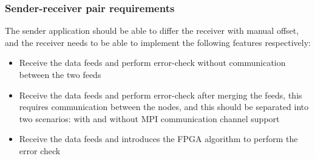 \documentclass[11pt,openright,a4paper]{report}
\begin{document}
\subsubsection{Sender-receiver pair requirements}
The sender application should be able to differ the receiver with manual offset, and the receiver needs to be able to implement the following features respectively:
\begin{itemize}
	\item Receive the data feeds and perform error-check without communication between the two feeds
	\item Receive the data feeds and perform error-check after merging the feeds, this requires communication between the nodes, and this should be separated into two scenarios: with and without MPI communication channel support
	\item Receive the data feeds and introduces the FPGA algorithm to perform the error check
\end{itemize}
\end{document}
